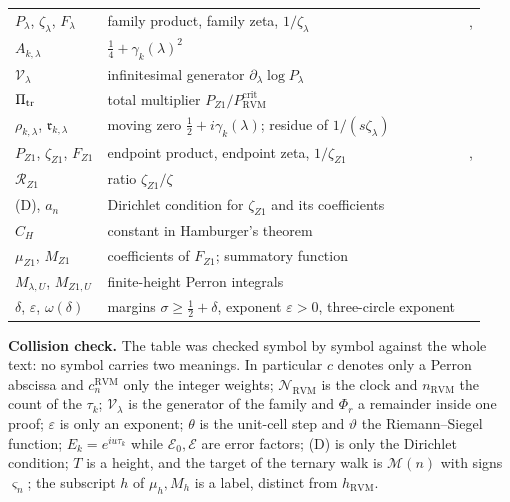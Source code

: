 \documentclass[11pt,reqno]{amsart}
\makeatletter
\let\CG@origeqref\eqref
\newcommand{\CG@gettip}[1]{\@ifundefined{CGTip@#1}{Reference: #1}{\csname CGTip@#1\endcsname}}
\DeclareRobustCommand{\CGeqref}[1]{\pdftooltip{\CG@origeqref{#1}}{\CG@gettip{#1}}}
\numberwithin{equation}{section}
\theoremstyle{plain}
\theoremstyle{definition}
\theoremstyle{remark}
\newcommand{\eps}{\varepsilon}
\newcommand{\RVM}{\mathrm{RVM}}
\newcommand{\crit}{\mathrm{crit}}
\newcommand{\NR}{\mathcal N_{\RVM}}
\makeatother
\begin{document}
{\begin{longtable}{>{\raggedright\arraybackslash}p{}>{\raggedright\arraybackslash}p{}>{\raggedright\arraybackslash}p{}}
$P_\lambda$, $\zeta_\lambda$, $F_\lambda$ & family product, family zeta, $1/\zeta_\lambda$ & \CGeqref{eq:P-lambda}, \CGeqref{eq:zeta-lambda}\\
$A_{k,\lambda}$ & $\tfrac14+\gamma_k(\lambda)^2$ & \CGeqref{eq:generator}\\
$\mathcal V_\lambda$ & infinitesimal generator $\partial_\lambda\log P_\lambda$ & \CGeqref{eq:generator}\\
$\Pi_{\rm tr}$ & total multiplier $P_{Z1}/P_{\RVM}^{\crit}$ & \CGeqref{eq:transport-multiplier}\\
$\rho_{k,\lambda}$, $\mathfrak r_{k,\lambda}$ & moving zero $\tfrac12+i\gamma_k(\lambda)$; residue of $1/(s\zeta_\lambda)$ & \CGeqref{eq:residue-transport}\\
$P_{Z1}$, $\zeta_{Z1}$, $F_{Z1}$ & endpoint product, endpoint zeta, $1/\zeta_{Z1}$ & \CGeqref{eq:Z1-product}, \CGeqref{eq:FZ1}\\
$\mathscr R_{Z1}$ & ratio $\zeta_{Z1}/\zeta$ & \CGeqref{eq:Z1-defect-ratio}\\
(D), $a_n$ & Dirichlet condition for $\zeta_{Z1}$ and its coefficients & \CGeqref{eq:Z1-D}\\
$C_H$ & constant in Hamburger's theorem & \CGeqref{eq:Hamburger-conclusion}\\
$\mu_{Z1}$, $M_{Z1}$ & coefficients of $F_{Z1}$; summatory function & \CGeqref{eq:Z1-reciprocal-Dirichlet}\\
$M_{\lambda,U}$, $M_{Z1,U}$ & finite-height Perron integrals & \CGeqref{eq:truncated-Perron}\\
$\delta$, $\eps$, $\omega(\delta)$ & margins $\sigma\ge\tfrac12+\delta$, exponent $\eps>0$, three-circle exponent & \CGeqref{eq:three-circles-exponent}\\
\end{longtable}
}

\medskip\noindent\textbf{Collision check.}
The table was checked symbol by symbol against the whole text: no symbol carries two meanings.  In particular $c$ denotes only a Perron abscissa and $c_n^{\RVM}$ only the integer weights; $\NR$ is the clock and $n_{\RVM}$ the count of the $\tau_k$; $\mathcal V_\lambda$ is the generator of the family and $\Phi_r$ a remainder inside one proof; $\eps$ is only an exponent; $\theta$ is the unit-cell step and $\vartheta$ the Riemann--Siegel function; $E_k=e^{iu\tau_k}$ while $\mathcal E_0,\mathcal E$ are error factors; (D) is only the Dirichlet condition; $T$ is a height, and the target of the ternary walk is $\mathcal M(n)$ with signs $\varsigma_n$; the subscript $h$ of $\mu_h,M_h$ is a label, distinct from $h_{\RVM}$.
\end{document}
